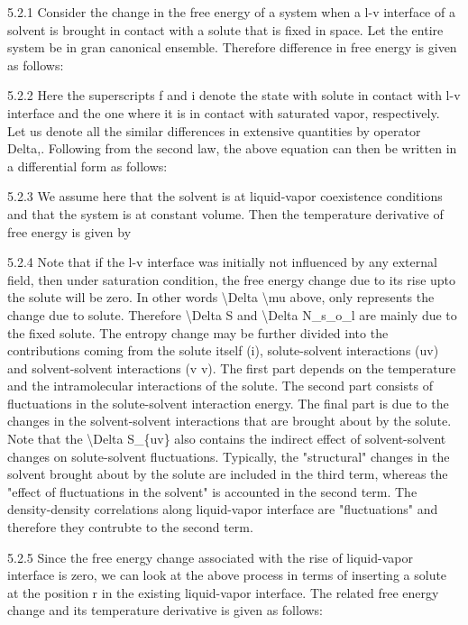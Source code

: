 \par 5.2.1 Consider the change in the free energy of a system when a l-v interface of a solvent is brought in contact with a solute that is fixed in space. Let the entire system be in gran canonical ensemble. Therefore difference in free energy is given as follows:
\par 5.2.2 Here the superscripts f and i denote the state with solute in contact with l-v interface and the one where it is in contact with saturated vapor, respectively. Let us denote all the similar differences in extensive quantities by operator Delta,. Following from the second law, the above equation can then be written in a differential form as follows:
\par 5.2.3 We assume here that the solvent is at liquid-vapor coexistence conditions and that the system is at constant volume. Then the temperature derivative of free energy is given by
\par 5.2.4 Note that if the l-v interface was initially not influenced by any external field, then under saturation condition, the free energy change due to its rise upto the solute will be zero. In other words \textbackslash Delta \textbackslash mu above, only represents the change due to solute. Therefore \textbackslash Delta S and \textbackslash Delta N\_s\_o\_l are mainly due to the fixed solute. The entropy change may be further divided into the contributions coming from the solute itself (i), solute-solvent interactions (uv) and solvent-solvent interactions (v v). The first part depends on the temperature and the intramolecular interactions of the solute. The second part consists of fluctuations in the solute-solvent interaction energy. The final part is due to the changes in the solvent-solvent interactions that are brought about by the solute. Note that the \textbackslash Delta S\_\{uv\} also contains the indirect effect of solvent-solvent changes on solute-solvent fluctuations. Typically, the "structural" changes in the solvent brought about by the solute are included in the third term, whereas the "effect of fluctuations in the solvent" is accounted in the second term. The density-density correlations along liquid-vapor interface are "fluctuations" and therefore they contrubte to the second term.
\par 5.2.5 Since the free energy change associated with the rise of liquid-vapor interface is zero, we can look at the above process in terms of inserting a solute at the position r in the existing liquid-vapor interface. The related free energy change and its temperature derivative is given as follows:
